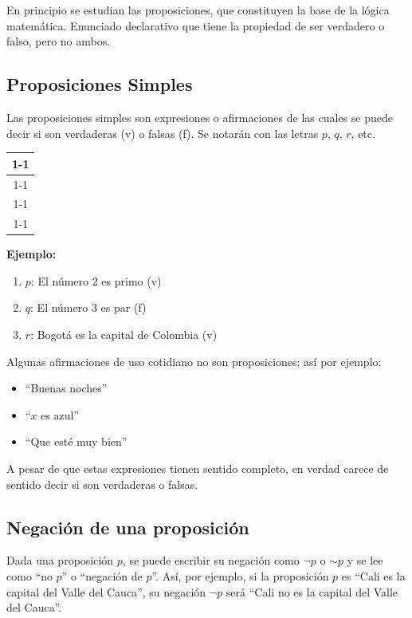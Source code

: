 En principio se estudian las proposiciones, que constituyen la base de la lógica matemática. Enunciado declarativo que tiene la propiedad de ser verdadero o falso, pero no ambos.

\subsection{Proposiciones Simples}

Las proposiciones simples son expresiones o afirmaciones de las cuales se puede decir si son verdaderas (v) o falsas (f). Se notarán con las letras $p$, $q$, $r$, etc.

\begin{table}[ht]
\centering
\begin{tabular}{c}
\cline{1-1}
\multicolumn{1}{|l|}{$p$}   \\ \cline{1-1}
\multicolumn{1}{|l|}{v} \\ \cline{1-1}
\multicolumn{1}{|l|}{f}  \\ \cline{1-1}
\end{tabular}
\end{table}

\noindent \textbf{Ejemplo:}
\begin{enumerate}
    \item $p$: El número 2 es primo (v)
    \item $q$: El número 3 es par (f)
    \item $r$: Bogotá es la capital de Colombia (v)
\end{enumerate}

Algunas afirmaciones de uso cotidiano no son proposiciones; así por ejemplo:
\begin{itemize}
    \item ``Buenas noches''
    \item ``$x$ es azul''
    \item ``Que esté muy bien''
\end{itemize}
A pesar de que estas expresiones tienen sentido completo, en verdad carece de sentido decir si son verdaderas o falsas.

\subsection{Negación de una proposición}

Dada una proposición $p$, se puede escribir su negación como $\lnot p$ o $\sim p$ y se lee como ``no $p$'' o ``negación de $p$''. Así, por ejemplo, si la proposición $p$ es ``Cali es la capital del Valle del Cauca'', su negación $\lnot p$ será ``Cali no es la capital del Valle del Cauca''.

